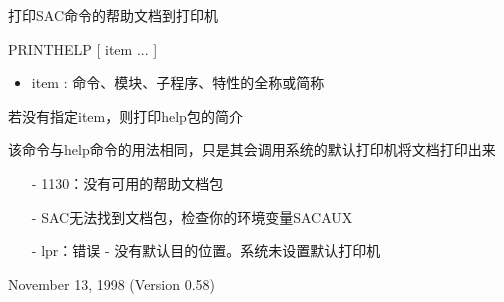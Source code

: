 \label{cmd:printhelp}

打印SAC命令的帮助文档到打印机

PRINTHELP [ item ... ]

\begin{itemize}
\item item : 命令、模块、子程序、特性的全称或简称
\end{itemize}

若没有指定item，则打印help包的简介

该命令与help命令的用法相同，只是其会调用系统的默认打印机将文档打印出来

\begin{itemize}
\item[-]1130：没有可用的帮助文档包
\item[-]SAC无法找到文档包，检查你的环境变量SACAUX	
\item[-]lpr：错误 - 没有默认目的位置。系统未设置默认打印机
\end{itemize}

November 13, 1998 (Version 0.58)
